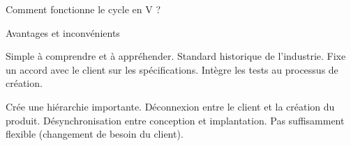 \begin{frame}{Comment fonctionne le cycle en V ?}
\end{frame}

\begin{frame}{Avantages et inconvénients}
    \begin{itemize}
        \itemcheck Simple à comprendre et à appréhender.
        \itemcheck Standard historique de l’industrie.
        \itemcheck Fixe un accord avec le client sur les spécifications.
        \itemcheck Intègre les tests au processus de création.
    \end{itemize}
    \pause
    \begin{itemize}
        \itemcross Crée une hiérarchie importante.
        \itemcross Déconnexion entre le client et la création du produit.
        \itemcross Désynchronisation entre conception et implantation.
        \itemcross Pas suffisamment flexible (changement de besoin du client).
    \end{itemize}
\end{frame}
